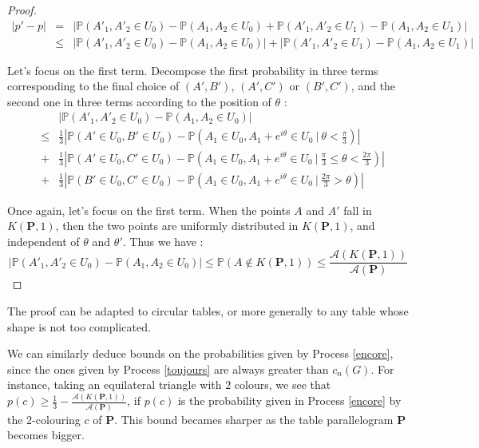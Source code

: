 \documentclass[a4paper,11pt]{article}
\theoremstyle{definition}
\theoremstyle{remark}
\begin{document}
\begin{proof}

\begin{eqnarray*}
|p' - p| 
  &=& | \mathbb{P}(A'_1 , A'_2 \in U_0) - \mathbb{P}(A_1 , A_2 \in U_0) + \mathbb{P}(A'_1 , A'_2 \in U_1) - \mathbb{P}(A_1 , A_2 \in U_1) | \\
  &\leq& | \mathbb{P}(A'_1 , A'_2 \in U_0) - \mathbb{P}(A_1 , A_2 \in U_0) | + | \mathbb{P}(A'_1 , A'_2 \in U_1) - \mathbb{P}(A_1 , A_2 \in U_1) | 
\end{eqnarray*}

Let's focus on the first term. 
Decompose the first probability in three terms corresponding to the final 
choice of $(A',B')$, $(A',C')$ or $(B',C')$, and the second one in three terms 
according to the position of $\theta$ :
\begin{eqnarray*}
& & \left| \mathbb{P}(A'_1 , A'_2 \in U_0) - \mathbb{P}(A_1 , A_2 \in U_0) \right| \\
&\leq& \frac{1}{3} \left| \mathbb{P}(A' \in U_0 , B' \in U_0) - \mathbb{P}(A_1 \in U_0 , A_1 + e^{i \theta} \in U_0 \ |\  \theta < \frac{\pi}{3} ) \right| \\
&+& \frac{1}{3} \left| \mathbb{P}(A' \in U_0 , C' \in U_0) - \mathbb{P}(A_1 \in U_0 , A_1 + e^{i \theta} \in U_0 \ |\  \frac{\pi}{3} \leq \theta < \frac{2 \pi}{3} ) \right| \\
&+& \frac{1}{3} \left| \mathbb{P}(B' \in U_0 ,C' \in U_0) - \mathbb{P}(A_1 \in U_0 , A_1 + e^{i \theta} \in U_0 \ | \  \frac{2 \pi}{3} > \theta ) \right|
\end{eqnarray*}

Once again, let's focus on the first term. When the points $A$ and 
$A'$ fall in $K(\mathbf{P},1)$, then the two points are uniformly distributed in 
$K(\mathbf{P},1)$, and independent of $\theta$ and $\theta'$. Thus we have : 
$$ \left| \mathbb{P}(A'_1 , A'_2 \in U_0) - \mathbb{P}(A_1 , A_2 \in U_0) \right| \leq \mathbb P(A \not \in K(\mathbf{P},1)) \leq \frac{\mathcal{A}(K(\mathbf{P},1))}{\mathcal{A}(\mathbf{P})} $$
\end{proof}
The proof can be adapted to circular tables, or more generally to any table 
whose shape is not too complicated.

We can similarly deduce bounds on the probabilities given by Process \ref{encore}, 
since the ones given by Process \ref{toujours} are always greater than $c_n(G)$.
For instance, taking an equilateral triangle with $2$ colours, we see that 
$p(c) \geq \frac13 - \frac{\mathcal{A}(K(\mathbf{P},1))}{\mathcal{A}(\mathbf{P})}$, 
if $p(c)$ is the probability given in Process \ref{encore} by the $2$-colouring 
$c$ of $\mathbf{P}$. 
This bound becames sharper as the table parallelogram $\mathbf{P}$ becomes bigger.
\end{document}
